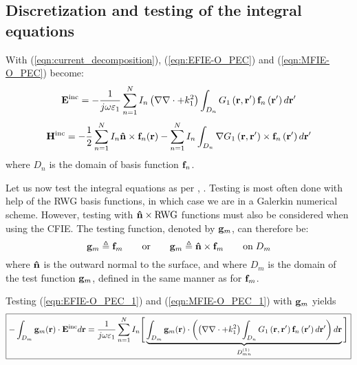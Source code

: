 \subsection{Discretization and testing of the integral equations}
%
\par
With (\ref{eqn:current_decomposition}), (\ref{eqn:EFIE-O_PEC}) and (\ref{eqn:MFIE-O_PEC}) become:
\begin{equation}\label{eqn:EFIE-O_PEC_1}
\mathbf{E}^\text{inc} =  - \frac{1}{j \omega \varepsilon_1} \sum_{n=1}^{N} I_n \left(\nabla \nabla \cdot + k_1^2\right) \int_{D_n} G_1\left(\mathbf{r}, \mathbf{r}'\right) \mathbf{f}_n\left(\mathbf{r}'\right) d\mathbf{r}'
\end{equation}
\begin{equation}\label{eqn:MFIE-O_PEC_1}
\mathbf{H}^\text{inc} = - \frac{1}{2} \sum_{n=1}^{N} I_n \mathbf{\hat{n}} \times \mathbf{f}_{n}\!\left(\mathbf{r}\right) - \sum_{n=1}^{N} I_n \int_{D_n} \nabla G_1\left(\mathbf{r}, \mathbf{r}'\right) \times \mathbf{f}_n\left(\mathbf{r}'\right) d\mathbf{r}'
\end{equation}
where $D_n$ is the domain of basis function $\mathbf{f}_n$.
%
\par
Let us now test the integral equations as per \cite{Har_68}, \cite{Rao_82}. Testing is most often done with help of the RWG basis functions, in which case we are in a Galerkin numerical scheme.  However, testing with $\mathbf{\Hat{n}} \times \text{RWG}$ functions must also be considered when using the CFIE. The testing function, denoted by $\mathbf{g}_m$, can therefore be:
\begin{equation}\label{eqn:testing_function}
\mathbf{g}_m \triangleq \mathbf{f}_m \qquad \text{or} \qquad \mathbf{g}_m \triangleq \mathbf{\Hat{n}} \times \mathbf{f}_m \qquad \text{on} \; D_m
\end{equation}
where $\mathbf{\Hat{n}}$ is the outward normal to the surface, and where $D_m$ is the domain of the test function $\mathbf{g}_m$, defined in the same manner as for $\mathbf{f}_m$.
%
\par
Testing (\ref{eqn:EFIE-O_PEC_1}) and (\ref{eqn:MFIE-O_PEC_1}) with $\mathbf{g}_m$ yields
\begin{equation}\label{eqn:EFIE-O_PEC_2}
\boxed{-\int_{D_m}\mathbf{g}_m \!\left(\mathbf{r}\right) \cdot \mathbf{E}^\text{inc} d\mathbf{r} =  \frac{1}{j \omega \varepsilon_1} \sum_{n=1}^{N} I_n \Bigg[\underbrace{\int_{D_m}\mathbf{g}_m \!\left(\mathbf{r}\right) \cdot \left( \left(\nabla \nabla \cdot + k_1^2\right) \int_{D_n} G_1\left(\mathbf{r}, \mathbf{r}'\right) \mathbf{f}_n\left(\mathbf{r}'\right) d\mathbf{r}' \right) d\mathbf{r}}_{D_{mn}^{(1)}} \Bigg]}
\end{equation}
